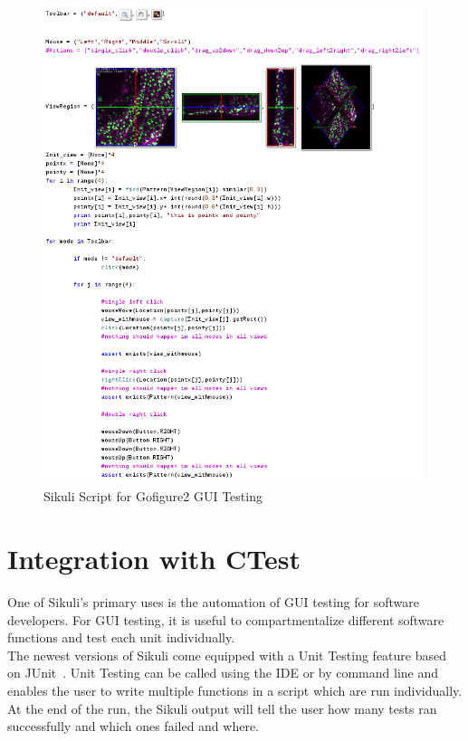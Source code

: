 \documentclass{InsightArticle}
\begin{document}
\begin{figure}[tbp]
 \centering
 \includegraphics[width=0.99\textwidth]{Images/Gofigure2Example.png}
 \caption{Sikuli Script for Gofigure2 GUI Testing}
 \label{fig:Gofigure2Example}
\end{figure}

\section{Integration with CTest}
\label{sec:IntegrationWithCTest}

One of Sikuli's primary uses is the automation of GUI testing for software
developers. For GUI testing, it is useful to compartmentalize different software
functions and test each unit individually.\\

The newest versions of Sikuli come equipped with a Unit Testing feature based
on JUnit~\cite{JUnit:Website}. Unit Testing can be called using the IDE or by
command line and enables the user to write multiple functions in a script which
are run individually. At the end of the run, the Sikuli output will tell the
user how many tests ran successfully and which ones failed and where.\\
\end{document}
